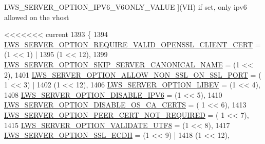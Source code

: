 \begin{Desc}
\begin{description}
{L\+W\+S\+\_\+\+S\+E\+R\+V\+E\+R\+\_\+\+O\+P\+T\+I\+O\+N\+\_\+\+I\+P\+V6\+\_\+\+V6\+O\+N\+L\+Y\+\_\+\+V\+A\+L\+UE\hypertarget{group__context-and-vhost_gga41c2d763f78cc248df3b9f8645dbd2a5aca5d42820b65eac5618ec3f0bd8a1160}{}\label{group__context-and-vhost_gga41c2d763f78cc248df3b9f8645dbd2a5aca5d42820b65eac5618ec3f0bd8a1160}
}](VH) if set, only ipv6 allowed on the vhost \end{description}
\end{Desc}

\begin{DoxyCode}
<<<<<<< current
1393                          \{
1394         \hyperlink{group__context-and-vhost_gga41c2d763f78cc248df3b9f8645dbd2a5a274ed462a1a9239eb6ddf9007f5b7092}{LWS\_SERVER\_OPTION\_REQUIRE\_VALID\_OPENSSL\_CLIENT\_CERT}  
      = (1 << 1) |
1395                                                                   (1 << 12),
1399         \hyperlink{group__context-and-vhost_gga41c2d763f78cc248df3b9f8645dbd2a5a6582c985ee0ceaadc1d277030eae2d7c}{LWS\_SERVER\_OPTION\_SKIP\_SERVER\_CANONICAL\_NAME}                
      = (1 << 2),
1401         \hyperlink{group__context-and-vhost_gga41c2d763f78cc248df3b9f8645dbd2a5a1cc4562d05cba52a6dfa0697a65ade0d}{LWS\_SERVER\_OPTION\_ALLOW\_NON\_SSL\_ON\_SSL\_PORT}          = (
      1 << 3) |
1402                                                                   (1 << 12),
1406         \hyperlink{group__context-and-vhost_gga41c2d763f78cc248df3b9f8645dbd2a5a273d9975675130de0c6dc937dde7c8a6}{LWS\_SERVER\_OPTION\_LIBEV}                                  = (1 << 4),
1408         \hyperlink{group__context-and-vhost_gga41c2d763f78cc248df3b9f8645dbd2a5a34ab36e68c0d593b6f19b8d5ef1240a9}{LWS\_SERVER\_OPTION\_DISABLE\_IPV6}                            = (1 << 5),
1410         \hyperlink{group__context-and-vhost_gga41c2d763f78cc248df3b9f8645dbd2a5a4933347a821e73c3f1e13fb6bfc7ad93}{LWS\_SERVER\_OPTION\_DISABLE\_OS\_CA\_CERTS}                      = (
      1 << 6),
1413         \hyperlink{group__context-and-vhost_gga41c2d763f78cc248df3b9f8645dbd2a5ac56a8a6590e74a8016d0fae09fb404fc}{LWS\_SERVER\_OPTION\_PEER\_CERT\_NOT\_REQUIRED}                = (
      1 << 7),
1415         \hyperlink{group__context-and-vhost_gga41c2d763f78cc248df3b9f8645dbd2a5aa0158b4e85420811e6b0f1378c6ded0f}{LWS\_SERVER\_OPTION\_VALIDATE\_UTF8}                          = (1 << 8),
1417         \hyperlink{group__context-and-vhost_gga41c2d763f78cc248df3b9f8645dbd2a5a1b2f8bde0f62adc7ebe81b2043f34c0c}{LWS\_SERVER\_OPTION\_SSL\_ECDH}                            = (1 << 9) |
1418                                                                   (1 << 12),

\end{DoxyCode}
